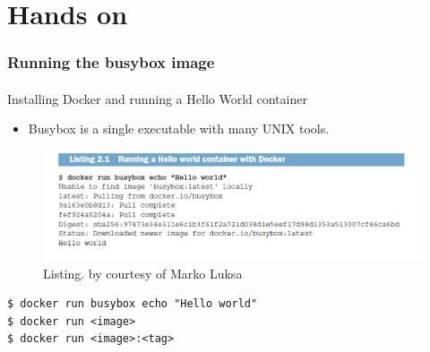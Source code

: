 
\section[Hands on]{Hands on}
\begin{frame}[fragile]
	\frametitle{Running the busybox image}
	\framesubtitle{}
	Installing Docker and running a Hello World container
	\begin{itemize}
		\item Busybox is a single executable with many UNIX tools.
	\end{itemize}
	\begin{figure}[htbp!]
		\includegraphics[width=1\textwidth]{listings/2_1.png}
		\caption{Listing. by courtesy of Marko Luksa\cite{Luksa2018}}
		\label{fig:}
	\end{figure}
	\begin{lstlisting}[numbers=none, basicstyle=\ttfamily]
$ docker run busybox echo "Hello world"
$ docker run <image>
$ docker run <image>:<tag>
	\end{lstlisting}
\end{frame}

